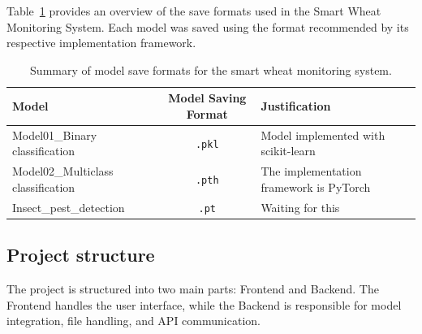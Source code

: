 Table~\ref{tab:ModelSaveFormats} provides an overview of the save formats used in the Smart Wheat Monitoring System. Each model was saved using the format recommended by its respective implementation framework.

\begin{table}[H]
\centering
\renewcommand{\arraystretch}{1.3}
\caption{Summary of model save formats for the smart wheat monitoring system.}
\begin{tabular}{|l|c|p{7cm}|}
\hline
\textbf{Model} & \textbf{Model Saving Format} & \textbf{Justification} \\
\hline
Model01\_Binary classification & \texttt{.pkl} & Model implemented with scikit-learn \\
\hline
Model02\_Multiclass classification & \texttt{.pth} & The implementation framework is PyTorch \\
\hline
Insect\_pest\_detection & \texttt{.pt} & Waiting for this \\
\hline
\end{tabular}
\label{tab:ModelSaveFormats}
\end{table}


\subsection{Project structure}
The project is structured into two main parts: Frontend and Backend. The Frontend handles the user interface, while the Backend is responsible for model integration, file handling, and API communication.

